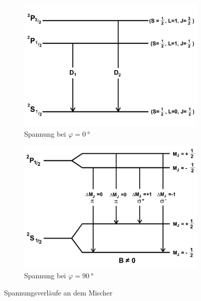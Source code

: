 \begin{figure}[h!]
 \centering
 \begin{subfigure}{0.48\textwidth}
  \centering
  \includegraphics[width=\textwidth]{doublett.pdf}
  \caption{Spannung bei $\varphi=\SI{0}{°}$}
  \label{fig:doublett}
 \end{subfigure}
 \begin{subfigure}{0.48\textwidth}
  \centering
  \includegraphics[width=\textwidth]{sigmaplus.pdf}
  \caption{Spannung bei $\varphi=\SI{90}{°}$}
  \label{fig:sigmaplus}
 \end{subfigure}
 \caption{Spannungsverläufe an dem Mischer}
 \label{fig:übergänge}
\end{figure}





